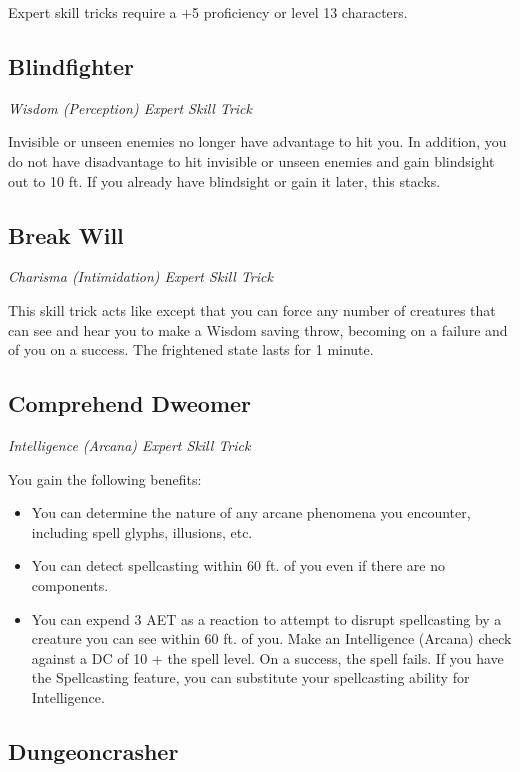 Expert skill tricks require a +5 proficiency or level 13 characters.

\subsection{Blindfighter}

\textit{Wisdom (Perception) Expert Skill Trick}

Invisible or unseen enemies no longer have advantage to hit you. In addition, you do not have disadvantage to hit invisible or unseen enemies and gain blindsight out to 10 ft. If you already have blindsight or gain it later, this stacks.

\subsection{Break Will}

\textit{Charisma (Intimidation) Expert Skill Trick}

This skill trick acts like  except that you can force any number of creatures that can see and hear you to make a Wisdom saving throw, becoming  on a failure and  of you on a success. The frightened state lasts for 1 minute.

\subsection{Comprehend Dweomer}

\textit{Intelligence (Arcana) Expert Skill Trick}

You gain the following benefits:
\begin{itemize}
	\item You can determine the nature of any arcane phenomena you encounter, including spell glyphs, illusions, etc.
	\item You can detect spellcasting within 60 ft. of you even if there are no components.
	\item You can expend 3 AET as a reaction to attempt to disrupt spellcasting by a creature you can see within 60 ft. of you. Make an Intelligence (Arcana) check against a DC of 10 + the spell level. On a success, the spell fails. If you have the Spellcasting feature, you can substitute your spellcasting ability for Intelligence.
\end{itemize}

\subsection{Dungeoncrasher}

